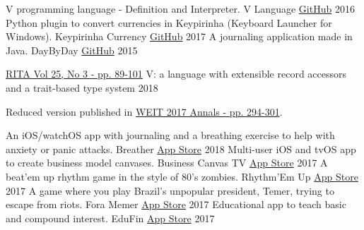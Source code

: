 

\begin{cventries}
  \cvcompactentry
    {V programming language - Definition and Interpreter.}
    {V Language}
    {\href{https://github.com/AvatarHurden/V}{GitHub}}
    {2016}
  \cvcompactentry
    {Python plugin to convert currencies in Keypirinha (Keyboard Launcher for Windows).}
    {Keypirinha Currency}
    {\href{https://github.com/AvatarHurden/keypirinha-currency}{GitHub}}
    {2017}
  \cvcompactentry
    {A journaling application made in Java.}
    {DayByDay}
    {\href{https://github.com/AvatarHurden/DayByDay}{GitHub}}
    {2015}

\end{cventries}

\newpage


\begin{cventries}
  \cventry
    {\href{http://seer.ufrgs.br/rita/article/view/VOL25_NR3_89}{RITA Vol 25, No 3 - pp. 89-101}}
    {V: a language with extensible record accessors and a trait-based type system}
    {2018}
    {}
    {
      \begin{cvitems}
        \item {Reduced version published in \href{http://weit2017.inf.ufsm.br/wp-content/uploads/2017/10/Versao_final.pdf}{WEIT 2017 Annals - pp. 294-301}}.
      \end{cvitems}
    }
\end{cventries}


\begin{cventries}
  \cvcompactentry
    {An iOS/watchOS app with journaling and a breathing exercise to help with anxiety or panic attacks.}
    {Breather}
    {\href{https://itunes.apple.com/app/id1370659046?mt=8}{App Store}}
    {2018}
  \cvcompactentry
    {Multi-user iOS and tvOS app to create business model canvases.}
    {Business Canvas TV}
    {\href{https://itunes.apple.com/app/id1292335686?mt=8}{App Store}}
    {2017}
  \cvcompactentry
    {A beat'em up rhythm game in the style of 80's zombies.}
    {Rhythm'Em Up}
    {\href{https://itunes.apple.com/app/id1262013610?mt=8}{App Store}}
    {2017}
  \cvcompactentry
    {A game where you play Brazil's unpopular president, Temer, trying to escape from riots.}
    {Fora Memer}
    {\href{https://itunes.apple.com/br/app/fora-memer/id1253655537?l=en&mt=8}{App Store}}
    {2017}
  \cvcompactentry
    {Educational app to teach basic and compound interest.}
    {EduFin}
    {\href{https://itunes.apple.com/app/id1231577657?mt=8}{App Store}}
    {2017}
\end{cventries}

